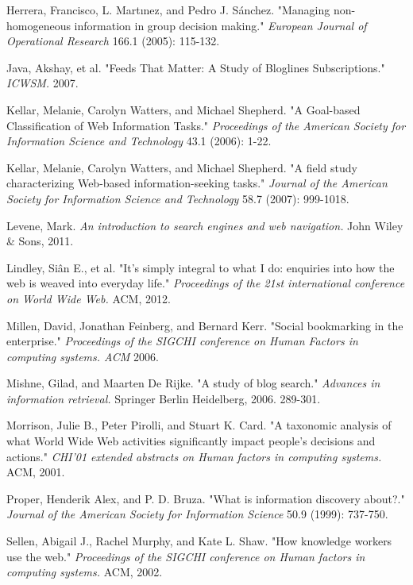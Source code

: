 \documentclass{casconpaper}
\begin{document}
{\begin{thebibliography}{9}
Herrera, Francisco, L. Martınez, and Pedro J. Sánchez. "Managing non-homogeneous information in group decision making." \emph{European Journal of Operational Research} 166.1 (2005): 115-132.

Java, Akshay, et al. "Feeds That Matter: A Study of Bloglines Subscriptions." \emph{ ICWSM.} 2007.
   
 Kellar, Melanie, Carolyn Watters, and Michael Shepherd. "A Goal-based Classification of Web Information Tasks." \emph{Proceedings of the American Society for Information Science and Technology} 43.1 (2006): 1-22.

Kellar, Melanie, Carolyn Watters, and Michael Shepherd. "A field study characterizing Web-based information-seeking tasks." \emph{Journal of the American Society for Information Science and Technology} 58.7 (2007): 999-1018.

Levene, Mark.  \emph{An introduction to search engines and web navigation.} John Wiley \& Sons, 2011.

Lindley, Siân E., et al. "It's simply integral to what I do: enquiries into how the web is weaved into everyday life." \emph{Proceedings of the 21st international conference on World Wide Web.} ACM, 2012.

Millen, David, Jonathan Feinberg, and Bernard Kerr. "Social bookmarking in the enterprise." \emph{Proceedings of the SIGCHI conference on Human Factors in computing systems. ACM} 2006.

Mishne, Gilad, and Maarten De Rijke. "A study of blog search." \emph{Advances in information retrieval.} Springer Berlin Heidelberg, 2006. 289-301.

Morrison, Julie B., Peter Pirolli, and Stuart K. Card. "A taxonomic analysis of what World Wide Web activities significantly impact people's decisions and actions." \emph{CHI'01 extended abstracts on Human factors in computing systems.} ACM, 2001.

Proper, Henderik Alex, and P. D. Bruza. "What is information discovery about?." \emph{Journal of the American Society for Information Science} 50.9 (1999): 737-750.



Sellen, Abigail J., Rachel Murphy, and Kate L. Shaw. "How knowledge workers use the web." \emph{Proceedings of the SIGCHI conference on Human factors in computing systems.} ACM, 2002.


\end{thebibliography}}
\end{document}
